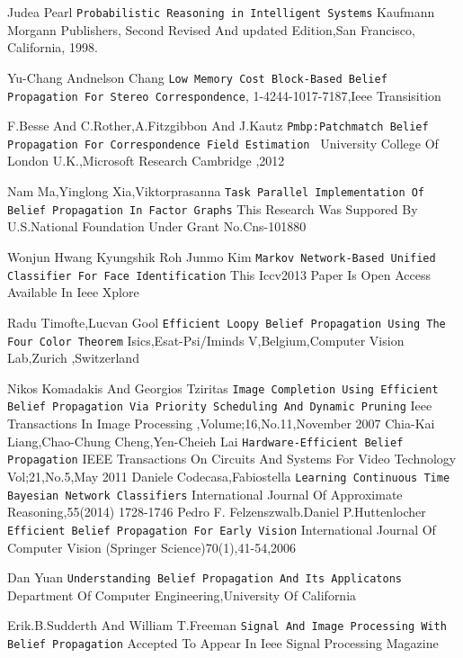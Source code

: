 \documentclass{raitdisser}
\begin{document}
\begin{thebibliography}{9}

Judea Pearl
\texttt{Probabilistic Reasoning in Intelligent Systems}
Kaufmann Morgann Publishers, Second Revised And updated Edition,San Francisco, California, 1998.

Yu-Chang Andnelson Chang
\texttt{Low Memory Cost Block-Based Belief Propagation For Stereo Correspondence},
1-4244-1017-7187,Ieee Transisition

F.Besse And C.Rother,A.Fitzgibbon And J.Kautz
\texttt{Pmbp:Patchmatch Belief Propagation For Correspondence Field Estimation }
University  College Of London U.K.,Microsoft Research Cambridge ,2012

Nam Ma,Yinglong Xia,Viktorprasanna
\texttt{Task Parallel Implementation Of Belief Propagation In Factor Graphs}
This Research Was Suppored By U.S.National Foundation Under Grant No.Cns-101880

Wonjun Hwang Kyungshik Roh Junmo Kim
\texttt{Markov Network-Based Unified Classifier For Face Identification}
This Iccv2013 Paper Is Open Access Available In Ieee Xplore

Radu Timofte,Lucvan Gool
\texttt{Efficient Loopy Belief Propagation Using The Four Color Theorem}
Isics,Esat-Psi/Iminds V,Belgium,Computer Vision Lab,Zurich ,Switzerland

Nikos Komadakis And Georgios Tziritas
\texttt{Image Completion Using Efficient Belief Propagation Via Priority Scheduling And Dynamic Pruning}
Ieee Transactions In Image Processing ,Volume;16,No.11,November 2007
Chia-Kai Liang,Chao-Chung Cheng,Yen-Cheieh Lai
\texttt{Hardware-Efficient Belief Propagation}
IEEE Transactions On Circuits And Systems For Video Technology Vol;21,No.5,May 2011
Daniele Codecasa,Fabiostella
\texttt{Learning Continuous Time Bayesian Network Classifiers}
International Journal Of Approximate Reasoning,55(2014) 1728-1746
Pedro F. Felzenszwalb.Daniel P.Huttenlocher
\texttt{Efficient Belief Propagation For Early Vision}
International Journal Of Computer Vision (Springer Science)70(1),41-54,2006

Dan Yuan
\texttt{Understanding Belief Propagation And Its Applicatons}
Department Of Computer Engineering,University Of California

Erik.B.Sudderth And William T.Freeman
\texttt{Signal And Image Processing With Belief Propagation}
Accepted To Appear In Ieee Signal Processing Magazine


\end{thebibliography}
\end{document}
